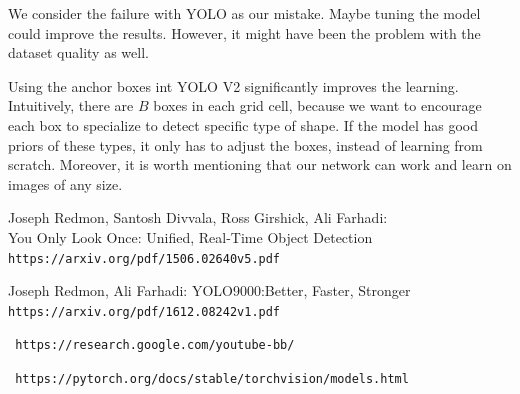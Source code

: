 \documentclass{article}
\begin{document}
We consider the failure with YOLO as our mistake. Maybe tuning the model could improve the results. However, it might have been the problem with the dataset quality as well.

Using the anchor boxes int YOLO V2 significantly improves the learning. Intuitively, there are $B$ boxes in each grid cell, because we want to encourage each box to specialize to detect specific type of shape. If the model has good priors of these types, it only has to adjust the boxes, instead of learning from scratch. Moreover, it is worth mentioning that our network can work and learn on images of any size. \\

\begin{thebibliography}{9}

Joseph Redmon, Santosh Divvala, Ross Girshick, Ali Farhadi:
\\You Only Look Once: Unified, Real-Time Object Detection
\\\texttt{https://arxiv.org/pdf/1506.02640v5.pdf}

Joseph Redmon, Ali Farhadi: YOLO9000:Better, Faster, Stronger
\\\texttt{https://arxiv.org/pdf/1612.08242v1.pdf}

\texttt{ https://research.google.com/youtube-bb/}

\texttt{ https://pytorch.org/docs/stable/torchvision/models.html }

\end{thebibliography}
\end{document}
